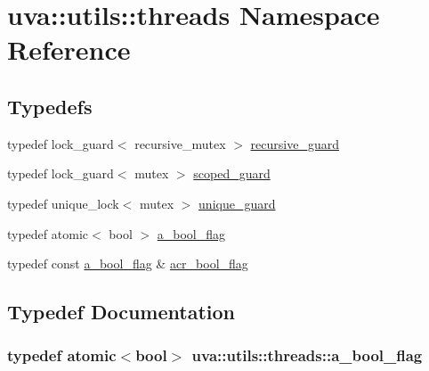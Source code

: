 \hypertarget{namespaceuva_1_1utils_1_1threads}{}\section{uva\+:\+:utils\+:\+:threads Namespace Reference}
\label{namespaceuva_1_1utils_1_1threads}
\subsection*{Typedefs}
\begin{DoxyCompactItemize}
\item 
typedef lock\+\_\+guard$<$ recursive\+\_\+mutex $>$ \hyperlink{namespaceuva_1_1utils_1_1threads_aa60e14c02bcbc10b6c6f7d22062a48a4}{recursive\+\_\+guard}
\item 
typedef lock\+\_\+guard$<$ mutex $>$ \hyperlink{namespaceuva_1_1utils_1_1threads_afa446d9b32371c0185332204ce17034d}{scoped\+\_\+guard}
\item 
typedef unique\+\_\+lock$<$ mutex $>$ \hyperlink{namespaceuva_1_1utils_1_1threads_a449ea792fd1291bd13c4d438470ab158}{unique\+\_\+guard}
\item 
typedef atomic$<$ bool $>$ \hyperlink{namespaceuva_1_1utils_1_1threads_a1443193735031ce29cdb04c157b308e4}{a\+\_\+bool\+\_\+flag}
\item 
typedef const \hyperlink{namespaceuva_1_1utils_1_1threads_a1443193735031ce29cdb04c157b308e4}{a\+\_\+bool\+\_\+flag} \& \hyperlink{namespaceuva_1_1utils_1_1threads_a1c174d3a90b2b056554d897188ad2c74}{acr\+\_\+bool\+\_\+flag}
\end{DoxyCompactItemize}


\subsection{Typedef Documentation}
\hypertarget{namespaceuva_1_1utils_1_1threads_a1443193735031ce29cdb04c157b308e4}{}
\subsubsection[{a\+\_\+bool\+\_\+flag}]{\setlength{\rightskip}{0pt plus 5cm}typedef atomic$<$bool$>$ {\bf uva\+::utils\+::threads\+::a\+\_\+bool\+\_\+flag}}\label{namespaceuva_1_1utils_1_1threads_a1443193735031ce29cdb04c157b308e4}


